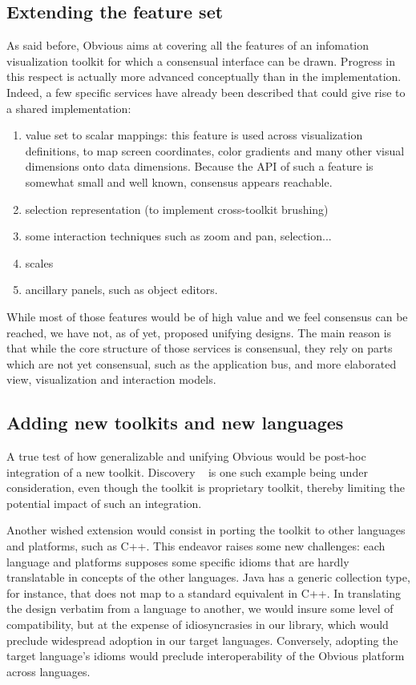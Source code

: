 \subsection{Extending the feature set}

As said before, Obvious aims at covering all the features of an
infomation visualization toolkit for which a consensual interface can
be drawn. Progress in this respect is actually more advanced
conceptually than in the implementation. Indeed, a few specific
services have already been described that could give rise to a shared
implementation:

\begin{enumerate}
\item value set to scalar mappings: this feature is used across
  visualization definitions, to map screen coordinates, color
  gradients and many other visual dimensions onto data
  dimensions. Because the API of such a feature is somewhat small and
  well known, consensus appears reachable.
\item selection representation (to implement cross-toolkit brushing)
\item some interaction techniques such as zoom and pan, selection...
\item scales
\item ancillary panels, such as object editors.
\end{enumerate}

While most of those features would be of high value and we feel consensus can be reached, we have not, as of yet, proposed unifying designs. The main reason is that while the core structure of those services is consensual, they rely on parts which are not yet consensual, such as the application bus, and more elaborated view, visualization and interaction models.

\subsection{Adding new toolkits and new languages}

A true test of how generalizable and unifying Obvious would be
post-hoc integration of a new toolkit. Discovery ~\cite{Discovery2} is
one such example being under consideration, even though the toolkit is
proprietary toolkit, thereby limiting the potential impact of such an
integration.

Another wished extension would consist in porting the toolkit to other
languages and platforms, such as C++. This endeavor raises some new
challenges: each language and platforms supposes some specific idioms
that are hardly translatable in concepts of the other languages. Java
has a generic collection type, for instance, that does not map to a
standard equivalent in C++. In translating the design verbatim from a
language to another, we would insure some level of compatibility, but
at the expense of idiosyncrasies in our library, which would preclude
widespread adoption in our target languages. Conversely, adopting the
target language's idioms would preclude interoperability of the
Obvious platform across languages.


